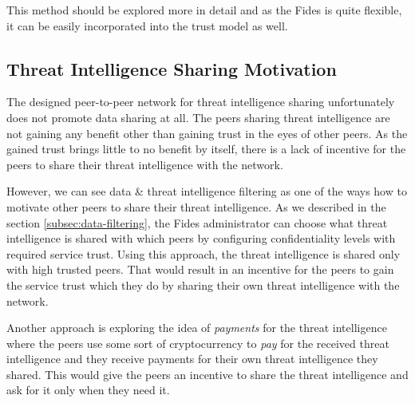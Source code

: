 This method should be explored more in detail and as the Fides is quite flexible, it can be easily incorporated into the trust model as well.

\subsection{Threat Intelligence Sharing Motivation}
\label{subsec:threat-intelligence-sharing-motivation}
The designed peer-to-peer network for threat intelligence sharing unfortunately does not promote data sharing at all.
The peers sharing threat intelligence are not gaining any benefit other than gaining trust in the eyes of other peers.
As the gained trust brings little to no benefit by itself, there is a lack of incentive for the peers to share their threat intelligence with the network.

However, we can see data \& threat intelligence filtering as one of the ways how to motivate other peers to share their threat intelligence.
As we described in the section \ref{subsec:data-filtering}, the Fides administrator can choose what threat intelligence is shared with which peers by configuring confidentiality levels with required service trust.
Using this approach, the threat intelligence is shared only with high trusted peers.
That would result in an incentive for the peers to gain the service trust which they do by sharing their own threat intelligence with the network.

Another approach is exploring the idea of \textit{payments} for the threat intelligence where the peers use some sort of cryptocurrency to \textit{pay} for the received threat intelligence and they receive payments for their own threat intelligence they shared.
This would give the peers an incentive to share the threat intelligence and ask for it only when they need it.